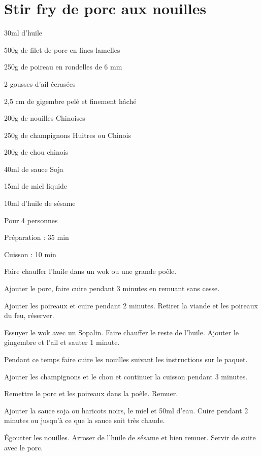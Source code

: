 \section[\normalsize{Stir fry de porc aux nouilles}]{Stir fry de porc aux nouilles}

\begin{ingredients}
\item 30ml d'huile
\item 500g de filet de porc en fines lamelles 
\item 250g de poireau en rondelles de 6 mm 
\item 2 gousses d'ail \'ecras\'ees 
\item 2,5 cm de gigembre pel\'e et finement h\^ach\'e 
\item 200g de nouilles Chinoises 
\item 250g de champignons Huitres ou Chinois 
\item 200g de chou chinois 
\item 40ml de sauce Soja
\item 15ml de miel liquide 
\item 10ml d'huile de s\'esame 
\end{ingredients}
\begin{infos}
\item Pour 4 personnes
\item Préparation : 35 min
\item Cuisson : 10 min
\end{infos}
\begin{etapes}
\item Faire chauffer l'huile dans un wok ou une grande poêle. 
\item Ajouter le porc, faire cuire pendant 3 minutes en remuant sans cesse. 
\item Ajouter les poireaux et cuire pendant 2 minutes. Retirer la viande et les poireaux du feu, r\'eserver.
\item Essuyer le wok avec un Sopalin. Faire chauffer le reste de l'huile. Ajouter le gingembre et l'ail et sauter 1 minute.
\item Pendant ce temps faire cuire les nouilles suivant les instructions sur le paquet.
\item Ajouter les champignons et le chou et continuer la cuisson pendant 3 minutes. 
\item Remettre le porc et les poireaux dans la poêle. Remuer. 
\item Ajouter la sauce soja ou haricots noirs, le miel et 50ml d'eau. Cuire pendant 2 minutes ou jusqu'\`a ce que la sauce soit tr\`es chaude.
\item Égoutter les nouilles. Arroser de l'huile de s\'esame et bien remuer. Servir de suite avec le porc.
\end{etapes}
\begin{conseils}
\end{conseils}
